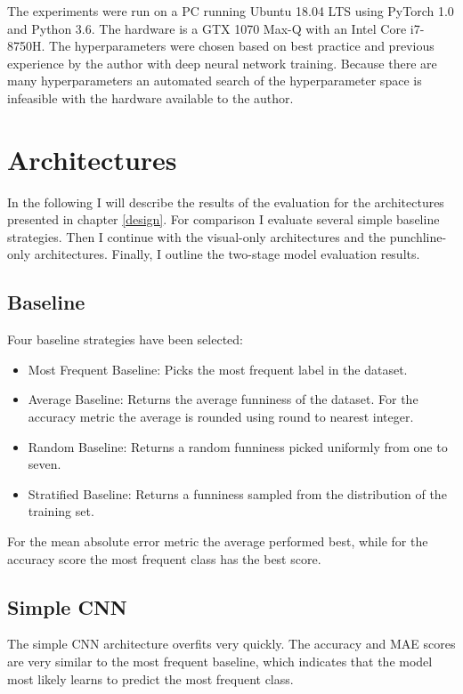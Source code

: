 \documentclass[draft,final,oneside]{vutinfth} %
\begin{document}
The experiments were run on a PC running Ubuntu 18.04 LTS using PyTorch 1.0 and Python 3.6. The hardware is a GTX 1070 Max-Q with an Intel Core i7-8750H. The hyperparameters were chosen based on best practice and previous experience by the author with deep neural network training. Because there are many hyperparameters an automated search of the hyperparameter space is infeasible with the hardware available to the author.





\section{Architectures}
In the following I will describe the results of the evaluation for the architectures presented in chapter \ref{design}. For comparison I evaluate several simple baseline strategies. Then I continue with the visual-only architectures and the punchline-only architectures. Finally, I outline the two-stage model evaluation results.

\subsection{Baseline}

Four baseline strategies have been selected: 

\begin{itemize}

\item Most Frequent Baseline: Picks the most frequent label in the dataset.
\item Average Baseline: Returns the average funniness of the dataset. For the accuracy metric the average is rounded using round to nearest integer.
\item Random Baseline: Returns a random funniness picked uniformly from one to seven.
\item Stratified Baseline: Returns a funniness sampled from the distribution of the
training set.

\end{itemize}

For the mean absolute error metric the average performed best, while for the accuracy score the most frequent class has the best score.

\subsection{Simple CNN}
The simple CNN architecture overfits very quickly. The accuracy and MAE scores are very similar to the most frequent baseline, which indicates that the model most likely learns to predict the most frequent class.
\end{document}
